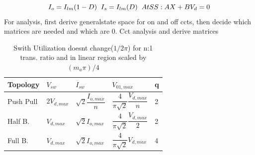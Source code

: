\documentclass[twocolumn, ]{article}
\begin{document}
\begin{equation*}
I_{o}=I_{lm}(1-D) 
\hspace{0.2cm}
I_{s}=I_{lm}(D)
\hspace{0.2cm}
At SS: AX+BV_{d}=0
\end{equation*}
For analysis, first derive generalstate space for on and off ccts, then decide which matrices are needed and which are 0. Cct analysis and derive matrices
\begin{table}[H]
\centering
\begin{tabular}{lllll}
    Topology & $V_{sw}$ & $I_{sw}$ & $V_{01,max}$ & q \\
    \hline

    Push Pull & $2V_{d,max}$ & $\sqrt2 \dfrac{I_{o,max}}{n}$ & $\dfrac{4}{\pi \sqrt2} \dfrac{V_{d,max}}{n}$ & 2 \\
    Half B. & $V_{d,max}$ & $\sqrt2 I_{o,max}$ & $\dfrac{4}{\pi \sqrt2} \dfrac{V_{d,max}}{2}$ & 2 \\
    Full B. & $V_{d,max}$ & $\sqrt2 I_{o,max}$ & $\dfrac{4}{\pi \sqrt2} V_{d,max}$ & 4 \\
 \end{tabular}   
  \caption{Swith Utilization doesnt change($1/2\pi$) for n:1 trans. ratio and in linear region scaled by $(m_{a}\pi)/4 $}
  
\end{table}
\end{document}
